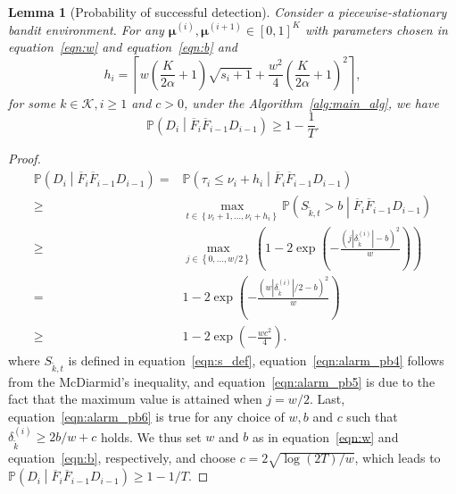 \documentclass[twoside]{article}
\def\eqref#1{equation~\ref{#1}}
\def\Algref#1{Algorithm~\ref{#1}}
\def\gK{{\mathcal{K}}}
\theoremstyle{plain}
\newtheorem{lemma}[theorem]{Lemma}
\theoremstyle{definition}
\theoremstyle{remark}
\begin{document}
\begin{lemma}[Probability of successful detection]\label{applemma:prob_delay} 
Consider a piecewise-stationary bandit environment. For any $\boldsymbol{\mu}^{(i)},\boldsymbol{\mu}^{(i+1)}\in\left[0,1\right]^{K}$ with parameters chosen in \eqref{eqn:w} and \eqref{eqn:b} 
and
\begin{equation}
h_{i} = \left\lceil w\left(\frac{K}{2\alpha}+1\right)\sqrt{s_{i}+1}+\frac{w^{2}}{4}\left(\frac{K}{2\alpha}+1\right)^{2} \right\rceil,
\end{equation}
for some $k\in\gK, i\geq 1$ and $c>0$, under the \Algref{alg:main_alg}, we have 
\begin{equation}
    \mathbb{P}\left(D_{i}\middle|\overline{F}_{i}\overline{F}_{i-1}D_{i-1}\right)\geq 1-\frac{1}{T}.
\end{equation}
\end{lemma}


\begin{proof}
    \begin{subequations}
        \begin{align}
            \mathbb{P}\left(D_{i}\middle|\overline{F}_{i}\overline{F}_{i-1}D_{i-1}\right)
            = &\mathbb{P}\left(\tau_{i}\leq \nu_{i}+h_{i}\middle|\overline{F}_{i}\overline{F}_{i-1}D_{i-1}\right)\\
            \geq &\max_{t \in \left\{ \nu_{i}+1,\ldots,\nu_{i}+h_{i}\right\}}\mathbb{P}\left(S_{\tilde{k},t}>b\middle| \overline{F}_{i}\overline{F}_{i-1}D_{i-1}\right)\label{eqn:alarm_pb3}\\
            \geq &\max_{j \in \left\{ 0,\ldots,w/2\right\}} \left(1-2\exp\left(-\frac{( j\left\lvert\delta^{(i)}_{\tilde{k}}\right\rvert-b)^{2}}{w}\right)\right)\label{eqn:alarm_pb4}\\
            = & 1-2\exp\left(-\frac{(w|\delta^{(i)}_{\tilde{k}}|/2-b)^{2}}{w}\right)\label{eqn:alarm_pb5}\\
            \geq & 1-2\exp\left(-\frac{wc^{2}}{4}\right)\label{eqn:alarm_pb6}.
        \end{align}
    \end{subequations}
    where $S_{\tilde{k},t}$ is defined in \eqref{eqn:s_def}, \eqref{eqn:alarm_pb4} follows from the McDiarmid’s inequality, and \eqref{eqn:alarm_pb5} is due to the fact that the maximum value is attained when $j=w/2$. Last, \eqref{eqn:alarm_pb6} is true for any choice of $w,b$ and $c$ such that $\delta^{(i)}_{\tilde{k}}\geq 2b/w+c$ holds. We thus set $w$ and $b$ as in \eqref{eqn:w} and \eqref{eqn:b}, respectively, and choose $c=2\sqrt{\log\left(2T\right)/w}$, which leads to $\mathbb{P}\left(D_{i}\middle|\overline{F}_{i}\overline{F}_{i-1}D_{i-1}\right)\geq 1-1/T$.
\end{proof}
    
\end{document}
